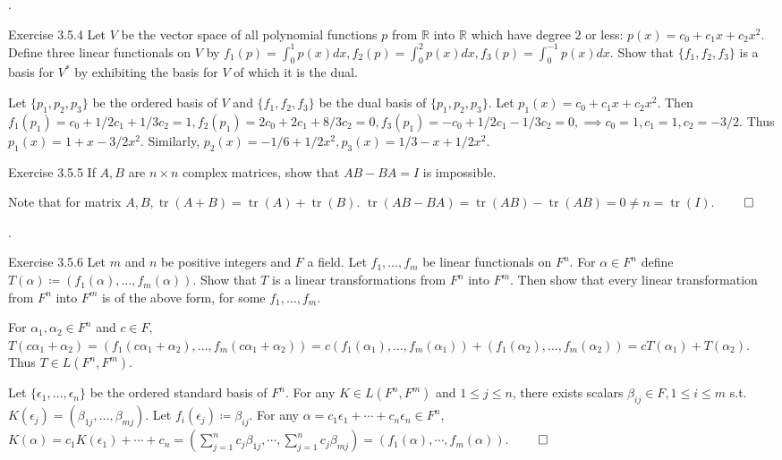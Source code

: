 \documentclass[8pt]{beamer}
\newcommand{\mbb}[1]{\mathbb{#1}}
\newcommand{\tr}{\operatorname{tr}}
\begin{document}
\begin{frame}{.}
    \begin{block}{Exercise 3.5.4}
        Let $V$ be the vector space of all polynomial functions $p$ from $\mbb{R}$ into $\mbb{R}$ which have degree $2$ or less: $p(x)= c_0 + c_1 x + c_2 x^2$.
        Define three linear functionals on $V$ by $f_1(p) = \int_0^1 p(x) dx, f_2(p) = \int_0^2 p(x) dx, f_3(p) = \int_0^{-1} p(x) dx$.
        Show that $\{f_1, f_2, f_3\}$ is a basis for $V^\ast$ by exhibiting the basis for $V$ of which it is the dual.

        \smallskip
        Let $\{p_1, p_2, p_3\}$ be the ordered basis of $V$ and $\{f_1, f_2, f_3\}$ be the dual basis of $\{p_1, p_2, p_3\}$.
        Let $p_1(x) = c_0 + c_1 x + c_2 x^2$. Then $f_1(p_1) = c_0 + 1/2c_1 + 1/3 c_2 = 1,f_2(p_1) = 2c_0 + 2c_1 + 8/3 c_2 = 0 ,f_3(p_1) = -c_0 +1/2 c_1 - 1/3 c_2 = 0,  \implies c_0 = 1, c_1=1, c_2 = -3/2$.
        Thus $p_1(x) = 1 + x -3/2 x^2$.
        Similarly, $p_2(x) = -1/6 + 1/2x^2, p_3(x) = 1/3 -x + 1/2x^2$.
    \end{block}

    \begin{block}{Exercise 3.5.5}
        If $A,B$ are $n\times n $ complex matrices, show that $AB -BA = I$ is impossible.

        \smallskip
        Note that for matrix $A,B, \tr (A+B) = \tr(A) + \tr(B)$.
        $\tr(AB - BA) = \tr(AB) - \tr(AB) = 0 \neq n = \tr(I)$.
        $\qed$
    \end{block}
\end{frame}

\begin{frame}{.}
    \begin{block}{Exercise 3.5.6}
        Let $m$ and $n$ be positive integers and $F$ a field.
        Let $f_1, \dots, f_m$ be linear functionals on $F^n$.
        For $\alpha \in F^n$ define $T(\alpha) \coloneq (f_1(\alpha), \dots, f_m(\alpha))$.
        Show that $T$ is a linear transformations from $F^n$ into $F^m$.
        Then show that every linear transformation from $F^n$ into $F^m$ is of the above form, for some $f_1, \dots, f_m$.

        \smallskip
        For $\alpha_1, \alpha_2 \in F^n$ and $c \in F$, $T(c\alpha_1 + \alpha_2) = (f_1(c\alpha_1 + \alpha_2), \dots, f_m(c\alpha_1 + \alpha_2)) = c( f_1(\alpha_1), \dots, f_m(\alpha_1)) + (f_1(\alpha_2), \dots, f_m(\alpha_2)) = cT(\alpha_1) + T(\alpha_2)$.
        Thus $T \in L(F^n, F^m)$.

        Let $\{\epsilon_1, \dots, \epsilon_n\}$ be the ordered standard basis of $F^n$.
        For any $K \in L(F^n, F^m)$ and $1 \leq j \leq n$, there exists scalars $\beta_{ij} \in F, 1 \leq i \leq m$ s.t. $K(\epsilon_j) = (\beta_{1j}, \dots, \beta_{mj})$.
        Let $f_i(\epsilon_j) \coloneq \beta_{ij}$.
        For any $\alpha = c_1 \epsilon_1 + \cdots + c_n \epsilon_n \in F^n$, $K(\alpha) = c_1 K(\epsilon_1) + \cdots + c_n = (\sum_{j=1}^n c_j \beta_{1j}, \cdots, \sum_{j=1}^n c_j \beta_{mj}) = (f_1(\alpha), \cdots, f_m(\alpha))$.
        $\qed$
    \end{block}
\end{frame}
\end{document}
